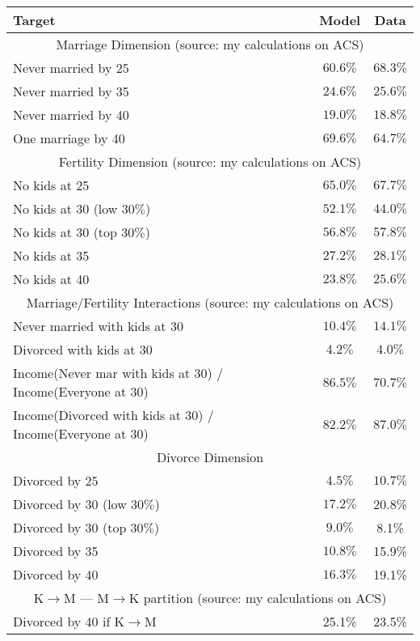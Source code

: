 \documentclass[12pt,letter]{article}
\begin{document}
\begin{table}
\begin{center}
\begin{tabular}{|l|c|c|}\hline
Target & Model & Data \\\hline
\multicolumn{3}{|c|}{Marriage Dimension (source: my calculations on ACS)} \\\hline
Never married by 25  & $60.6\%$ & $68.3\%$ \\
Never married by 35 & $24.6\%$ & $25.6\%$  \\
Never married by 40 & $19.0\%$ & $18.8\%$  \\\hline
One marriage by 40  & $69.6\%$ & $64.7\%$ \\\hline
\multicolumn{3}{|c|}{Fertility Dimension (source: my calculations on ACS)} \\\hline
No kids at 25 & $65.0\%$  & $67.7\%$ \\
No kids at 30 (low $30\%$) & $52.1\%$  &   $44.0\%$ \\
No kids at 30 (top $30\%$) & $56.8\%$ &   $57.8\%$ \\
No kids at 35  &  $27.2\%$ &   $28.1\%$ \\
No kids at 40 & $23.8\%$ & $25.6\%$ \\\hline
\multicolumn{3}{|c|}{Marriage/Fertility Interactions (source: my calculations on ACS)} \\\hline
Never married with kids at 30 & $10.4\%$  & $14.1\%$ \\
Divorced with kids at 30 & $4.2\%$ & $4.0\%$ \\
{\footnotesize Income(Never mar with kids at 30) / Income(Everyone at 30)} & $86.5\%$ & $70.7\%$\\
{\footnotesize Income(Divorced with kids at 30) / Income(Everyone at 30)} & $82.2\%$ & $87.0\%$\\\hline
\multicolumn{3}{|c|}{Divorce Dimension } \\\hline
Divorced by 25 &  $4.5\%$  & $10.7\%$ \\
Divorced by 30 (low $30\%$)  & $17.2\%$ &     20.8\% \\
Divorced by 30 (top $30\%$)  & $9.0\%$ &     8.1\% \\
Divorced by 35  & $10.8\%$ &    15.9\% \\
Divorced by 40  & $16.3\%$  &    19.1\% \\\hline
\multicolumn{3}{|c|}{K$\to$M --- M$\to$K partition (source: my calculations on ACS)} \\\hline
Divorced by 40 if K$\to$M & 25.1\% &   23.5\% \\

\end{tabular}
\end{center}
\end{table}
\end{document}

